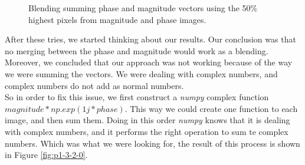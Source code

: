 \documentclass[12pt,a4paper]{article}
\begin{document}
\begin{figure}[!h]
	\centering
	{%
		\setlength{\fboxsep}{1pt}%
		\setlength{\fboxrule}{1pt}%
	}%
	\caption{Blending summing phase and magnitude vectors using the 50\% highest pixels from magnitude and phase images.}
	\label{fig:fourier2}
\end{figure}

After these tries, we started thinking about our results. Our conclusion was that no merging between the phase and magnitude would work as a blending. Moreover, we concluded that our approach was not working because of the way we were summing the vectors. We were dealing with complex numbers, and complex numbers do not add as normal numbers.  \\

So in order to fix this issue, we first construct a \emph{numpy} complex function $magnitude * np.exp(1j*phase)$. This way we could create one function to each image, and then sum them. Doing in this order \emph{numpy} knows that it is dealing with complex numbers, and it performs the right operation to sum te complex numbers. Which was what we were looking for, the result of this process is shown in Figure \ref{fig:p1-3-2-0}. \\
\end{document}
